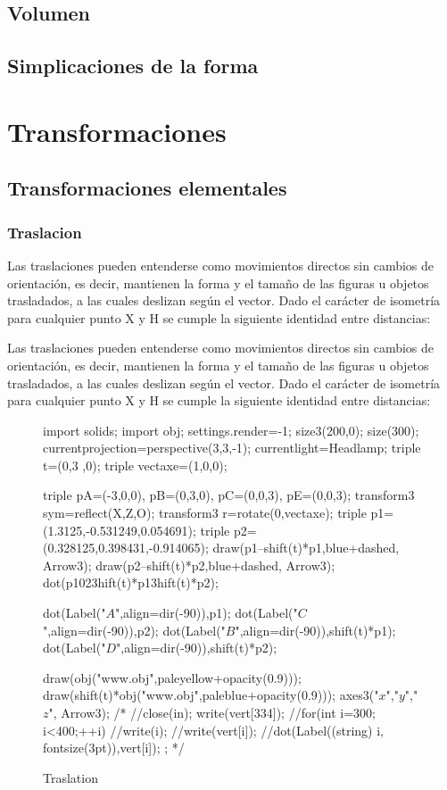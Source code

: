 \documentclass[a4paper]{book}
\begin{document}
\section{Volumen}
\section{Simplicaciones de la forma}


\chapter{Transformaciones}

\section{Transformaciones elementales}
\subsection{Traslacion}

Las traslaciones pueden entenderse como movimientos directos sin cambios de orientación, es decir, mantienen la forma y el tamaño de las figuras u objetos trasladados, a las cuales deslizan según el vector. Dado el carácter de isometría para cualquier punto X y H se cumple la siguiente identidad entre distancias:

Las traslaciones pueden entenderse como movimientos directos sin cambios de orientación, es decir, mantienen la forma y el tamaño de las figuras u objetos trasladados, a las cuales deslizan según el vector. Dado el carácter de isometría para cualquier punto X y H se cumple la siguiente identidad entre distancias:

\begin{figure}[!ht]
	\centering
	\begin{asy}
	import solids;
	import  obj;
	settings.render=-1;
	size3(200,0);
	size(300);
	currentprojection=perspective(3,3,-1);
	currentlight=Headlamp;
	triple t=(0,3 ,0);
	triple vectaxe=(1,0,0);

	triple pA=(-3,0,0), pB=(0,3,0), pC=(0,0,3), pE=(0,0,3);
	transform3 sym=reflect(X,Z,O);
	transform3 r=rotate(0,vectaxe);
	triple p1=(1.3125,-0.531249,0.054691);
	triple p2=(0.328125,0.398431,-0.914065);
	draw(p1--shift(t)*p1,blue+dashed, Arrow3);
	draw(p2--shift(t)*p2,blue+dashed, Arrow3);
	dot(p1^^p2^^shift(t)*p1^^shift(t)*p2);

	dot(Label("$A$",align=dir(-90)),p1);
	dot(Label("$C$",align=dir(-90)),p2);
	dot(Label("$B$",align=dir(-90)),shift(t)*p1);
	dot(Label("$D$",align=dir(-90)),shift(t)*p2);

	draw(obj("www.obj",paleyellow+opacity(0.9)));
	draw(shift(t)*obj("www.obj",paleblue+opacity(0.9)));
	axes3("$x$","$y$","$z$", Arrow3);
	/*
	//close(in);
	write(vert[334]);
	//for(int i=300; i<400;++i){
	//write(i);
	//write(vert[i]);
	//dot(Label((string) i, fontsize(3pt)),vert[i]);
	};
	*/
	\end{asy}
	\caption{Traslation}
\end{figure}
\end{document}

